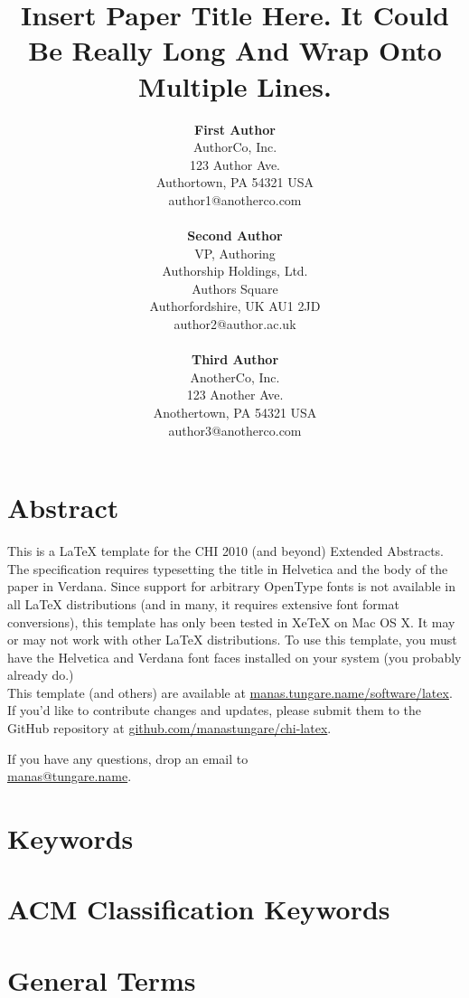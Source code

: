 \documentclass{chi-ext}
\title{Insert Paper Title Here. It Could Be Really Long And Wrap Onto Multiple Lines.}
\author{
  \textbf{First Author} \\
  AuthorCo, Inc. \\
  123 Author Ave. \\
  Authortown, PA 54321 USA \\
  author1@anotherco.com \\
  \\
  \textbf{Second Author} \\
  VP, Authoring \\
  Authorship Holdings, Ltd. \\
  Authors Square \\
  Authorfordshire, UK AU1 2JD \\
  author2@author.ac.uk \\
  \\
  \textbf{Third Author} \\
  AnotherCo, Inc. \\
  123 Another Ave. \\
  Anothertown, PA 54321 USA \\
  author3@anotherco.com \\
}
\begin{document}
\maketitle

\begin{multicols}{2}

\makeauthors
\makecopyright

\begin{flushleft}

\section{Abstract}

This is a LaTeX template for the CHI 2010 (and beyond) Extended Abstracts. The specification
requires typesetting the title in Helvetica and the body of the paper in Verdana. Since support for
arbitrary OpenType fonts is not available in all LaTeX distributions (and in many, it requires
extensive font format conversions), this template has only been tested in XeTeX on Mac OS X. It may
or may not work with other LaTeX distributions. To use this template, you must have the Helvetica
and Verdana font faces installed on your system (you probably already do.)
\\

This template (and others) are available at
\href{http://manas.tungare.name/software/latex}{manas.tungare.name/software/latex}.
If you'd like to contribute changes and updates, please submit them to the GitHub repository at
\href{https://github.com/manastungare/chi-latex}{github.com/manastungare/chi-latex}.

If you have any questions, drop an email to \\
\href{mailto:manas@tungare.name}{manas@tungare.name}.

\section{Keywords}
\makeatletter \@keywords \makeatother

\section{ACM Classification Keywords}
\makeatletter \@acmclassification \makeatother

\section{General Terms}
\makeatletter \@generalterms \makeatother


\end{flushleft}
\end{multicols}
\end{document}
